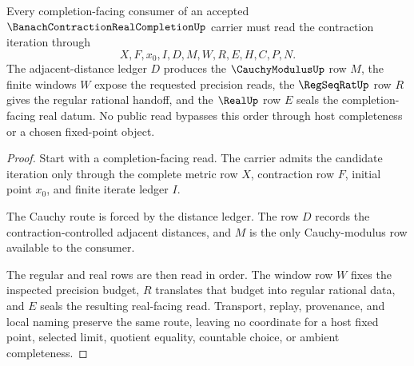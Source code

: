 \begin{theorem}
\label{thm:banach-contraction-real-completion-iteration-cauchy-route}
Every completion-facing consumer of an accepted $\BanachContractionRealCompletionUp$ carrier must read the contraction iteration through
$$
X,F,x_0,I,D,M,W,R,E,H,C,P,N .
$$
The adjacent-distance ledger $D$ produces the $\CauchyModulusUp$ row $M$, the finite windows $W$ expose the requested precision reads, the $\RegSeqRatUp$ row $R$ gives the regular rational handoff, and the $\RealUp$ row $E$ seals the completion-facing real datum. No public read bypasses this order through host completeness or a chosen fixed-point object.
\end{theorem}
\begin{proof}
Start with a completion-facing read. The carrier admits the candidate iteration only through the complete metric row $X$, contraction row $F$, initial point $x_0$, and finite iterate ledger $I$.

The Cauchy route is forced by the distance ledger. The row $D$ records the contraction-controlled adjacent distances, and $M$ is the only Cauchy-modulus row available to the consumer.

The regular and real rows are then read in order. The window row $W$ fixes the inspected precision budget, $R$ translates that budget into regular rational data, and $E$ seals the resulting real-facing read. Transport, replay, provenance, and local naming preserve the same route, leaving no coordinate for a host fixed point, selected limit, quotient equality, countable choice, or ambient completeness.
\end{proof}




